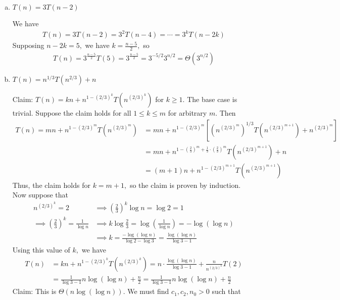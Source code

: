 \documentclass{article}
\begin{document}
\begin{enumerate}[(a)]
	\item $T(n)=3T(n-2)$
		\begin{soln}
			We have
			\begin{align*}
				T(n)=3T(n-2)=3^2T(n-4)=\cdots=3^kT(n-2k)
			\end{align*}
			Supposing $n-2k=5,$ we have $k=\frac{n-5}{2},$ so
			\begin{align*}
				T(n)=3^{\frac{n-5}{2}}T(5)=3^{\frac{n-5}{2}}= 3^{-5/2} 3^{n/2}=\Theta(3^{n/2})
			\end{align*}
		\end{soln}

	\item $T(n)=n^{1/3} T(n^{2/3}) + n$
		\begin{soln}
			Claim: $T(n)=kn+n^{1-(2/3)^k}T\left( n^{(2/3)^k} \right)$ for $k\ge 1.$ The base case is trivial. Suppose the claim holds for all $1\le k\le m$ for arbitrary $m.$ Then
			\begin{align*}
				T(n) = mn+n^{1-(2/3)^m} T\left( n^{(2/3)^m} \right) &= mn + n^{1-(2/3)^m} \left[ \left( n^{(2/3)^m} \right)^{1/3} T\left( n^{(2/3)^{m+1}} \right) + n^{(2/3)^m} \right] \\
				&= mn + n^{1-\left( \frac{2}{3} \right)^m + \frac{1}{3}\cdot\left( \frac{2}{3} \right)^m} T\left( n^{(2/3)^{m+1}} \right) + n \\
				&= (m+1)n + n^{1-(2/3)^{m+1}}T\left( n^{(2/3)^{m+1}} \right)
			\end{align*}
			Thus, the claim holds for $k=m+1,$ so the claim is proven by induction. Now suppose that
			\begin{align*}
				n^{(2/3)^k} = 2 &\implies \left( \frac{2}{3} \right)^k\log n = \log 2 = 1 \\
				\implies \left( \frac{2}{3} \right)^k = \frac{1}{\log n} &\implies k\log \frac{2}{3} = \log\left( \frac{1}{\log n} \right) = -\log(\log n) \\
				&\implies k = \frac{-\log(\log n)}{\log 2-\log 3} = \frac{\log(\log n)}{\log 3-1}
			\end{align*}
			Using this value of $k,$ we have
			\begin{align*}
				T(n) &= kn + n^{1-(2/3)^k} T\left(n^{(2/3)^k}\right) = n\cdot \frac{\log(\log n)}{\log 3 - 1} + \frac{n}{n^{(2/3)^k}} T(2) \\
				&= \frac{1}{\log 3 - 1} n\log(\log n) + \frac{n}{2} = \frac{1}{\log 3 - 1}n\log(\log n) + \frac{n}{2}
			\end{align*}
			Claim: This is $\Theta\left( n\log(\log n) \right).$ We must find $c_1, c_2, n_0>0$ such that 

\end{soln}
\end{enumerate}
\end{document}
